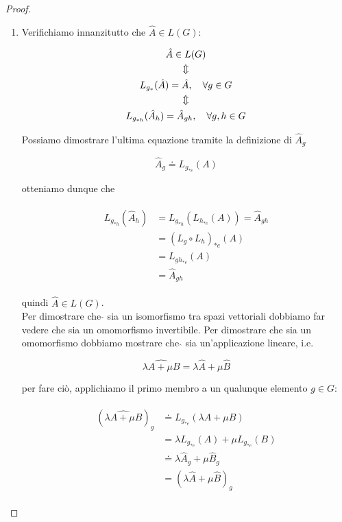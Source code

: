 \begin{proof}
	\begin{enumerate}
		\item Verifichiamo innanzitutto che $ \hat{A} \in L(G) $:
		
		\begin{gather}
			\hat{A} \in L(G)\nonumber\\%
			\Updownarrow\nonumber\\%
			L_{g_{*}}(\hat{A}) = \hat{A} \qcomma \forall g \in G\\%
			\Updownarrow\nonumber\\%
			L_{g_{*h}}(\hat{A}_{h}) = \hat{A}_{gh} \qcomma \forall g,h \in G\nonumber
		\end{gather}
	
		Possiamo dimostrare l'ultima equazione tramite la definizione di $ \hat{A}_{g} $
		
		\begin{equation}
			\hat{A}_{g} \doteq L_{g_{*e}}(A)
		\end{equation}
	
		otteniamo dunque che
		
		\begin{align}
			\begin{split}
				L_{g_{*h}}(\hat{A}_{h}) &= L_{g_{*h}}(L_{h_{*e}}(A)) = \hat{A}_{gh}\\
				&= (L_{g} \circ L_{h})_{*e} (A)\\
				&= L_{gh_{*e}} (A)\\
				&= \hat{A}_{gh}
			\end{split}
		\end{align}
	
		quindi $ \hat{A} \in L(G) $.\\
		Per dimostrare che $ \hat{} $ sia un isomorfismo tra spazi vettoriali dobbiamo far vedere che sia un omomorfismo invertibile. Per dimostrare che sia un omomorfismo dobbiamo mostrare che $ \hat{} $ sia un'applicazione lineare, i.e.
		
		\begin{equation}
			\widehat{\lambda A + \mu B} = \lambda \hat{A} + \mu \hat{B}
		\end{equation}
	
		per fare ciò, applichiamo il primo membro a un qualunque elemento $ g \in G $:
	
		\begin{align}
			\begin{split}
				(\widehat{\lambda A + \mu B})_{g} &\doteq L_{g_{*e}} (\lambda A + \mu B)\\
				&= \lambda L_{g_{*e}} (A) + \mu L_{g_{*e}} (B)\\
				&\doteq \lambda \hat{A}_{g} + \mu \hat{B}_{g}\\
				&= (\lambda \hat{A} + \mu \hat{B})_{g}
			\end{split}
		\end{align}
	

\end{enumerate}
\end{proof}
